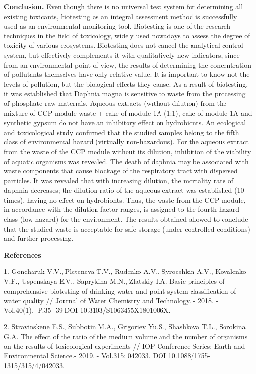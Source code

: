 {\bfseries Conclusion.} Even though there is no universal test system for
determining all existing toxicants, biotesting as an integral assessment
method is successfully used as an environmental monitoring tool.
Biotesting is one of the research techniques in the field of toxicology,
widely used nowadays to assess the degree of toxicity of various
ecosystems. Biotesting does not cancel the analytical control system,
but effectively complements it with qualitatively new indicators, since
from an environmental point of view, the results of determining the
concentration of pollutants themselves have only relative value. It is
important to know not the levels of pollution, but the biological
effects they cause. As a result of biotesting, it was established that
Daphnia magna is sensitive to waste from the processing of phosphate raw
materials. Aqueous extracts (without dilution) from the mixture of CCP
module waste + cake of module 1A (1:1), cake of module 1A and synthetic
gypsum do not have an inhibitory effect on hydrobionts. An ecological
and toxicological study confirmed that the studied samples belong to the
fifth class of environmental hazard (virtually non-hazardous). For the
aqueous extract from the waste of the CCP module without its dilution,
inhibition of the viability of aquatic organisms was revealed. The death
of daphnia may be associated with waste components that cause blockage
of the respiratory tract with dispersed particles. It was revealed that
with increasing dilution, the mortality rate of daphnia decreases; the
dilution ratio of the aqueous extract was established (10 times), having
no effect on hydrobionts. Thus, the waste from the CCP module, in
accordance with the dilution factor ranges, is assigned to the fourth
hazard class (low hazard) for the environment. The results obtained
allowed to conclude that the studied waste is acceptable for safe
storage (under controlled conditions) and further processing.

{\bfseries References}

1. Goncharuk V.V., Pleteneva T.V., Rudenko A.V., Syroeshkin A.V.,
Kovalenko V.F., Uspenskaya E.V., Saprykina M.N., Zlatskiy I.A. Basic
principles of comprehensive biotesting of drinking water and point
system classification of water quality // Journal of Water Chemistry and
Technology. - 2018. - Vol.40(1).- P.35- 39 DOI
10.3103/S1063455X1801006X.

2. Stravinskene E.S., Subbotin M.A., Grigoriev Yu.S., Shashkova T.L.,
Sorokina G.A. The effect of the ratio of the medium volume and the
number of organisms on the results of toxicological experiments // IOP
Conference Series: Earth and Environmental Science.- 2019. - Vol.315:
042033. DOI 10.1088/1755- 1315/315/4/042033.

